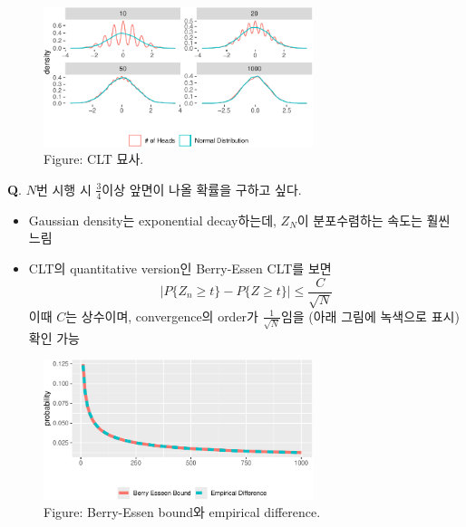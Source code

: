 \documentclass[
  letterpaper,
  DIV=11,
  numbers=noendperiod]{scrreprt}
\theoremstyle{plain}
\theoremstyle{definition}
\theoremstyle{definition}
\theoremstyle{plain}
\theoremstyle{plain}
\theoremstyle{remark}
\begin{document}
\begin{figure}[H]

{\centering \includegraphics[width=0.7\textwidth,height=\textheight]{ineq_files/figure-pdf/unnamed-chunk-2-1.pdf}

}

\caption{Figure: CLT 묘사.}

\end{figure}%

\textbf{Q}. \(N\)번 시행 시 \(\frac{3}{4}\)이상 앞면이 나올 확률을
구하고 싶다.

\begin{itemize}
\item
  Gaussian density는 exponential decay하는데, \(Z_N\)이 분포수렴하는
  속도는 훨씬 느림
\item
  CLT의 quantitative version인 Berry-Essen CLT를 보면 \[
  |P\{Z_n \geq t\} - P\{Z \geq t\} | \leq \frac{C}{\sqrt{N}}
  \] 이때 \(C\)는 상수이며, convergence의 order가
  \(\frac{1}{\sqrt{N}}\)임을 (아래 그림에 녹색으로 표시) 확인 가능
\end{itemize}

\begin{figure}[H]

{\centering \includegraphics[width=0.7\textwidth,height=\textheight]{ineq_files/figure-pdf/unnamed-chunk-3-1.pdf}

}

\caption{Figure: Berry-Essen bound와 empirical difference.}

\end{figure}%
\end{document}

